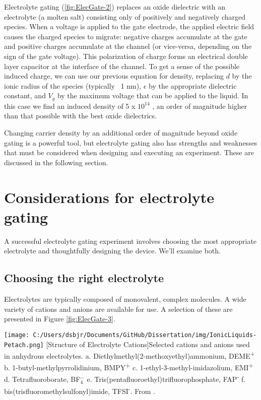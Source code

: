 Electrolyte gating (\ref{fig:ElecGate-2}) replaces an oxide dielectric with an electrolyte (a molten salt) consisting only of positively and negatively charged species. When a voltage is applied to the gate electrode, the applied electric field causes the charged species to migrate: negative charges accumulate at the gate and positive charges accumulate at the channel (or vice-versa, depending on the sign of the gate voltage). This polarization of charge forms an electrical double layer capacitor at the interface of the channel. To get a sense of the possible induced charge, we can use our previous equation for density, replacing $d$ by the ionic radius of the species (typically ~1 nm), $\epsilon$ by the appropriate dielectric constant, and $V_{g}$ by the maximum voltage that can be applied to the liquid. In this case we find an induced density of 5 x $10^{14}$ \percmsq , an order of magnitude higher than that possible with the best oxide dielectrics.

Changing carrier density by an additional order of magnitude beyond oxide gating is a powerful tool, but electrolyte gating also has strengths and weaknesses that must be considered when designing and executing an experiment. These are discussed in the following section.

\section{Considerations for electrolyte gating}

A successful electrolyte gating experiment involves choosing the most appropriate electrolyte and thoughtfully designing the device. We'll examine both.

\subsection{Choosing the right electrolyte}

Electrolytes are typically composed of monovalent, complex molecules. A wide variety of cations and anions are available for use. A selection of these are presented in Figure \ref{fig:ElecGate-3}.

\begin{centering}
\texttt{[image: C:/Users/dsbjr/Documents/GitHub/Dissertation/img/IonicLiquids-Petach.png]}
  \captionsetup{width=0.75\textwidth}
  [Structure of Electrolyte Cations]{Selected cations and anions used in anhydrous electrolytes. a. Diethylmethyl(2-methoxyethyl)ammonium, DEME\textsuperscript{+} b. 1-butyl-methylpyrrolidinium, BMPY\textsuperscript{+} c. 1-ethyl-3-methyl-imidazolium, EMI\textsuperscript{+} d. Tetrafluoroborate, BF$_{4}^{-}$ e. Tris(pentafluoroethyl)trifluorophosphate, FAP\textsuperscript{-} f. bis(trisfluoromethylsulfonyl)imide, TFSI\textsuperscript{-}. From \cite{Petach2017}.} 
  \label{fig:ElecGate-3}
\end{centering}

